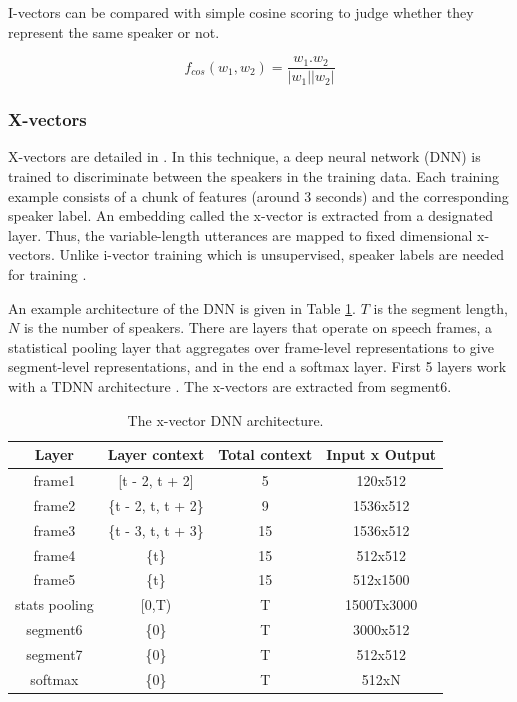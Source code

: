 		I-vectors can be compared with simple cosine scoring to judge whether they represent the same speaker or not.
		
		$$ f_{cos}(w_1, w_2) = \frac{w_1.w_2}{|w_1||w_2|} $$
		
		\subsubsection{X-vectors}
		X-vectors are detailed in \cite{snyder2018x}. In this technique, a deep neural network (DNN) is trained to discriminate between the speakers in the training data. Each training example consists of a chunk of features (around 3 seconds) and the corresponding speaker label. An embedding called the x-vector is extracted from a designated layer. Thus, the variable-length utterances are mapped to fixed dimensional x-vectors. Unlike i-vector training which is unsupervised, speaker labels are needed for training \cite{stafylakis2019self}.
		
		An example architecture of the DNN is given in Table \ref{table-xvec-dnn}. $T$ is the segment length, $N$ is the number of speakers. There are layers that operate on speech frames, a statistical pooling layer that aggregates over frame-level representations to give segment-level representations, and in the end a softmax layer. First 5 layers work with a TDNN architecture \cite{peddinti2015time}. The x-vectors are extracted from segment6.
		
		\begin{table}[h]
			\centering
			\begin{tabular}{|c|c|c|c|}
				\hline
				Layer & Layer context & Total context & Input x Output \\
				\hline
				frame1 & [t - 2, t + 2] & 5 & 120x512 \\
				frame2 & \{t - 2, t, t + 2\} & 9 & 1536x512 \\
				frame3 & \{t - 3, t, t + 3\} & 15 & 1536x512 \\
				frame4 & \{t\} & 15 & 512x512 \\
				frame5 & \{t\} & 15 & 512x1500 \\
				stats pooling & [0,T) & T & 1500Tx3000 \\
				segment6 & \{0\} & T & 3000x512 \\
				segment7 & \{0\} & T & 512x512 \\
				softmax & \{0\} & T & 512xN \\
				\hline
			\end{tabular}
			\caption{The x-vector DNN architecture.}
			\label{table-xvec-dnn}
		\end{table}
		
